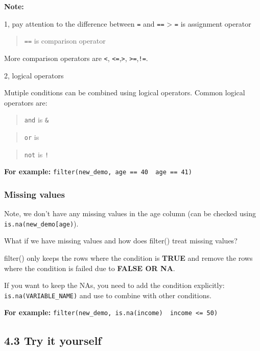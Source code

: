 \documentclass[
]{book}
\begin{document}
\textbf{Note:}

1, pay attention to the difference between \texttt{=} and \texttt{==}
\textgreater{} \texttt{=} is assignment operator

\begin{quote}
\texttt{==} is comparison operator
\end{quote}

More comparison operators are \texttt{\textless{}}, \texttt{\textless{}=},\texttt{\textgreater{}}, \texttt{\textgreater{}=},\texttt{!=}.

2, logical operators

Mutiple conditions can be combined using logical operators. Common logical operators are:

\begin{quote}
\texttt{and} is \texttt{\&}
\end{quote}

\begin{quote}
\texttt{or} is \texttt{\textbar{}}
\end{quote}

\begin{quote}
\texttt{not} is \texttt{!}
\end{quote}

\textbf{For example:} \texttt{filter(new\_demo,\ age\ ==\ 40\ \textbar{}\ age\ ==\ 41)}

\hypertarget{missing-values-1}{%
\subsubsection{Missing values}\label{missing-values-1}}

Note, we don't have any missing values in the age column (can be checked using \texttt{is.na(new\_demo{[}\textquotesingle{}age\textquotesingle{}{]})}).

What if we have missing values and how does filter() treat missing values?

filter() only keeps the rows where the condition is \textbf{TRUE} and remove the rows where the condition is failed due to \textbf{FALSE OR NA}.

If you want to keep the NAs, you need to add the condition explicitly: \texttt{is.na(VARIABLE\_NAME)} and use \texttt{\textbar{}} to combine with other conditions.

\textbf{For example:} \texttt{filter(new\_demo,\ is.na(income)\ \textbar{}\ income\ \textless{}=\ 50)}

\hypertarget{try-it-yourself-16}{%
\subsection{4.3 Try it yourself}\label{try-it-yourself-16}}
\end{document}
